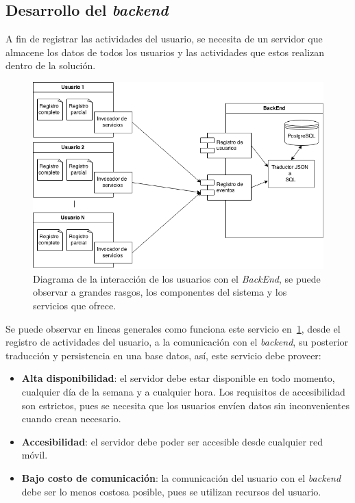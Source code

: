 \subsection{Desarrollo del \textit{backend}}


A fin de registrar las actividades del usuario, se necesita de un servidor que
almacene los datos de todos los usuarios y las actividades que estos realizan
dentro de la solución.

\begin{figure}[ht]
\centering
\includegraphics[scale=0.5]{tecnologias/images/backend_diagrama.png}
\caption{Diagrama de la interacción de los usuarios con el \textit{BackEnd}, se
    puede observar a grandes rasgos, los componentes del sistema y los servicios
    que ofrece.}
\label{fig:backend_diagrama}
\end{figure}


Se puede observar en lineas generales como funciona este servicio
en~\ref{fig:backend_diagrama}, desde el registro de actividades del usuario, a
la comunicación con el \textit{backend}, su posterior traducción y persistencia
en una base datos, así, este servicio debe proveer:

\begin{itemize}
    \item \textbf{Alta disponibilidad}: el servidor debe estar disponible en
        todo momento, cualquier día de la semana y a cualquier hora. Los
        requisitos de accesibilidad son estrictos, pues se necesita que los
        usuarios envíen datos sin inconvenientes cuando crean necesario.
    \item \textbf{Accesibilidad}: el servidor debe poder ser accesible desde
        cualquier red móvil.
    \item \textbf{Bajo costo de comunicación}: la comunicación del usuario con
        el \textit{backend} debe ser lo menos costosa posible, pues se utilizan
        recursos del usuario.
\end{itemize}

